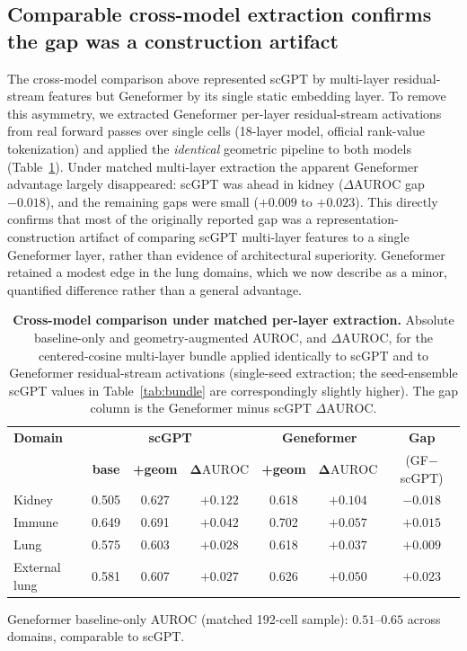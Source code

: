 \documentclass[11pt]{article}
\newcommand{\DAURC}{\Delta\mathrm{AUROC}}
\begin{document}
\subsection*{Comparable cross-model extraction confirms the gap was a construction artifact}

The cross-model comparison above represented scGPT by multi-layer residual-stream features but Geneformer by its single static embedding layer.
To remove this asymmetry, we extracted Geneformer per-layer residual-stream activations from real forward passes over single cells (18-layer model, official rank-value tokenization) and applied the \emph{identical} geometric pipeline to both models (Table~\ref{tab:crossmatched}).
Under matched multi-layer extraction the apparent Geneformer advantage largely disappeared: scGPT was ahead in kidney ($\DAURC$ gap $-0.018$), and the remaining gaps were small ($+0.009$ to $+0.023$).
This directly confirms that most of the originally reported gap was a representation-construction artifact of comparing scGPT multi-layer features to a single Geneformer layer, rather than evidence of architectural superiority.
Geneformer retained a modest edge in the lung domains, which we now describe as a minor, quantified difference rather than a general advantage.

\begin{table}[t]
\centering
\caption{\textbf{Cross-model comparison under matched per-layer extraction.}
Absolute baseline-only and geometry-augmented AUROC, and $\DAURC$, for the centered-cosine multi-layer bundle applied identically to scGPT and to Geneformer residual-stream activations (single-seed extraction; the seed-ensemble scGPT values in Table~\ref{tab:bundle} are correspondingly slightly higher).
The gap column is the Geneformer minus scGPT $\DAURC$.}
\label{tab:crossmatched}
\small
\begin{tabular}{lcccccc}
\toprule
\textbf{Domain} & \multicolumn{3}{c}{\textbf{scGPT}} & \multicolumn{2}{c}{\textbf{Geneformer}} & \textbf{Gap} \\
 & \textbf{base} & \textbf{+geom} & $\boldsymbol{\DAURC}$ & \textbf{+geom} & $\boldsymbol{\DAURC}$ & (GF$-$scGPT) \\
\midrule
Kidney        & 0.505 & 0.627 & $+0.122$ & 0.618 & $+0.104$ & $-0.018$ \\
Immune        & 0.649 & 0.691 & $+0.042$ & 0.702 & $+0.057$ & $+0.015$ \\
Lung          & 0.575 & 0.603 & $+0.028$ & 0.618 & $+0.037$ & $+0.009$ \\
External lung & 0.581 & 0.607 & $+0.027$ & 0.626 & $+0.050$ & $+0.023$ \\
\bottomrule
\end{tabular}
\par\smallskip
\footnotesize Geneformer baseline-only AUROC (matched 192-cell sample): $0.51$--$0.65$ across domains, comparable to scGPT.
\end{table}
\end{document}
